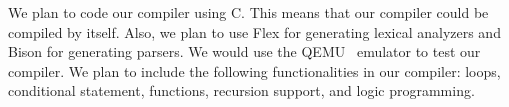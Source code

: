 We plan to code our compiler using C. This means that our compiler 
could be compiled by itself. Also, we plan to use Flex for generating 
lexical analyzers and Bison for generating parsers. We would use the QEMU~\cite{Qemu}
emulator to test our compiler. We plan to include the following functionalities in our compiler: loops, conditional statement, functions, recursion support, and logic programming.